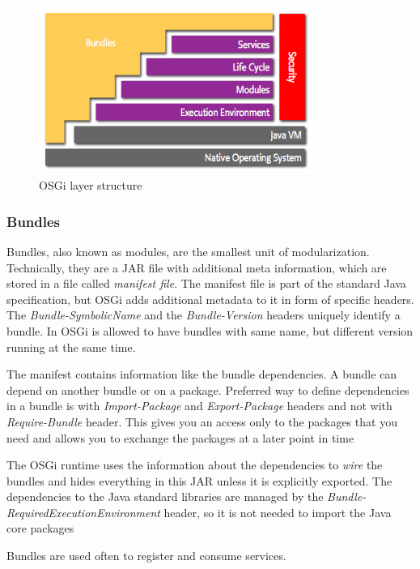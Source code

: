 \begin{figure}
	\centering
	\includegraphics[width=0.8\textwidth]{images/Chapter_05/osgi-layering.png}
	\caption{OSGi layer structure}
	\label{fig:osgi-layering}
\end{figure}

\subsubsection{Bundles}
Bundles, also known as modules, are the smallest unit of modularization. Technically, they are a JAR file with additional meta information, 
which are stored in a file called \textit{manifest file}. The manifest file is part of the standard Java specification, but OSGi adds additional 
metadata to it in form of specific headers. The \textit{Bundle-SymbolicName} and the \textit{Bundle-Version} headers uniquely identify a 
bundle. In OSGi is allowed to have bundles with same name, but different version running at the same time.

The manifest contains information like the bundle dependencies. A bundle can depend on another bundle or on a package. Preferred way 
to define dependencies in a bundle is with \textit{Import-Package} and \textit{Export-Package} headers and not with \textit{Require-Bundle} 
header. This gives you an access only to the packages that you need and allows you to exchange the packages at a later point in time

The OSGi runtime uses the information about the dependencies to \textit{wire} the bundles and hides everything in this JAR unless it is 
explicitly exported. The dependencies to the Java standard libraries are managed by the \textit{Bundle-RequiredExecutionEnvironment} 
header, so it is not needed to import the Java core packages

Bundles are used often to register and consume services.

